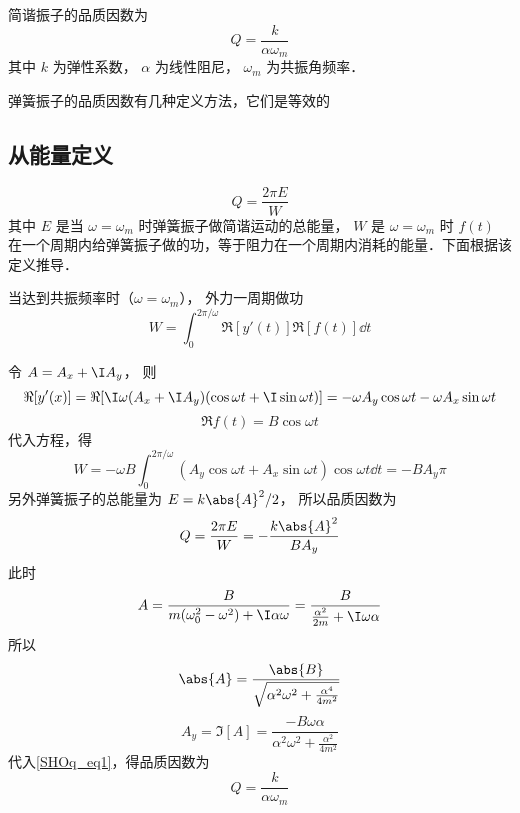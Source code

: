 

简谐振子的品质因数为
\begin{equation}
Q = \frac{k}{\alpha \omega_m}
\end{equation}
其中 $k$ 为弹性系数， $\alpha$ 为线性阻尼， $\omega_m$ 为共振角频率．

弹簧振子的品质因数有几种定义方法，它们是等效的

\subsection{从能量定义}
\begin{equation}
Q = \frac{2\pi E}{W}
\end{equation}
其中 $E$ 是当 $\omega = \omega_m$ 时弹簧振子做简谐运动的总能量， $W$ 是 $\omega = \omega_m$ 时 $f(t)$ 在一个周期内给弹簧振子做的功，等于阻力在一个周期内消耗的能量．下面根据该定义推导．

当达到共振频率时（$\omega = \omega_m$）， 外力一周期做功
\begin{equation}
W = \int_0^{2\pi/\omega} \Re[y'(t)] \Re[f(t)] \dd{t}
\end{equation}

令 $A = A_x + \I A_y$， 则
\begin{equation}
\Re[y'(x)] = \Re[\I\omega (A_x + \I A_y)(\cos\omega t + \I \sin\omega t)] = -\omega A_y \cos\omega t - \omega A_x \sin\omega t
\end{equation}
\begin{equation}
\Re f(t) = B\cos \omega t
\end{equation}
代入方程，得
\begin{equation}
W = -\omega B \int_0^{2\pi/\omega} (A_y \cos\omega t + A_x \sin\omega t) \cos\omega t \dd{t} = -B A_y \pi
\end{equation}
另外弹簧振子的总能量为 $E = k\abs{A}^2/2$， 所以品质因数为
\begin{equation}\label{SHOq_eq1}
Q = \frac{2\pi E}{W} = -\frac{k\abs{A}^2}{B A_y}
\end{equation}
此时
\begin{equation}
A = \frac{B}{m(\omega_0^2 - \omega^2) + \I \alpha\omega} = \frac{B}{\frac{\alpha^2}{2m} + \I\omega \alpha}
\end{equation}
所以
\begin{equation}
\abs{A} = \frac{\abs{B}}{\sqrt{\alpha^2\omega^2 + \frac{\alpha^4}{4m^2}}}
\end{equation}
\begin{equation}
A_y = \Im[A] = \frac{-B\omega\alpha}{\alpha^2\omega^2 + \frac{\alpha^2}{4m^2}}
\end{equation}
代入\autoref{SHOq_eq1}，得品质因数为
\begin{equation}
Q = \frac{k}{\alpha\omega_m}
\end{equation}

